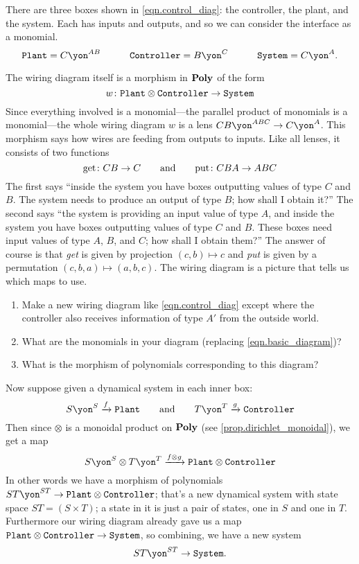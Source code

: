 \documentclass[DynamicalBook]{subfiles}
\begin{document}
There are three boxes shown in \eqref{eqn.control_diag}: the controller, the plant, and the system. Each has inputs and outputs, and so we can consider the interface as a monomial.
\begin{equation}\label{eqn.basic_diagram}
	\const{Plant}=C\yon^{AB}
	\qquad\quad
	\const{Controller} = B\yon^C
	\qquad\quad
	\const{System} = C\yon^A.
\end{equation}

The wiring diagram itself is a morphism in $\textbf{Poly}$ of the form
\[
	w\colon\mathtt{Plant}\otimes\mathtt{Controller}\to\mathtt{System}
\]
Since everything involved is a monomial---the parallel product of monomials is a monomial---the whole wiring diagram $w$ is a lens $CB\yon^{ABC}\to C\yon^A$. This morphism says how wires are feeding from outputs to inputs. Like all lenses, it consists of two functions
\[
  \text{get}\colon CB\to C
  \qquad\text{and}\qquad
  \text{put}\colon CBA\to ABC
\]
The first says ``inside the system you have boxes outputting values of type $C$ and $B$. The system needs to produce an output of type $B$; how shall I obtain it?'' The second says ``the system is providing an input value of type $A$, and inside the system you have boxes outputting values of type $C$ and $B$. These boxes need input values of type $A$, $B$, and $C$; how shall I obtain them?'' The answer of course is that \emph{get} is given by projection $(c,b)\mapsto c$ and \emph{put} is given by a permutation $(c,b,a)\mapsto (a,b,c)$. The wiring diagram is a picture that tells us which maps to use.

\begin{exercise}
\begin{enumerate}
	\item Make a new wiring diagram like \eqref{eqn.control_diag} except where the controller also receives information of type $A'$ from the outside world.
	\item What are the monomials in your diagram (replacing \eqref{eqn.basic_diagram})?
	\item What is the morphism of polynomials corresponding to this diagram?
\qedhere
\end{enumerate}
\end{exercise}

Now suppose given a dynamical system in each inner box:
\[
S\yon^S\To{f}\const{Plant}
\qqand
T\yon^T\To{g}\const{Controller}
\]
Then since $\otimes$ is a monoidal product on $\textbf{Poly}$ (see \cref{prop.dirichlet_monoidal}), we get a map
\[
S\yon^S\otimes T\yon^T\To{f\otimes g}\const{Plant}\otimes\const{Controller}
\]
In other words we have a morphism of polynomials $ST\yon^{ST}\to \const{Plant}\otimes\const{Controller}$; that's a new dynamical system with state space $ST=(S\times T)$; a state in it is just a pair of states, one in $S$ and one in $T$. Furthermore our wiring diagram already gave us a map $\mathtt{Plant}\otimes\mathtt{Controller}\to\mathtt{System}$, so combining, we have a new system
\[
ST\yon^{ST}\to\const{System}.
\]
\end{document}
